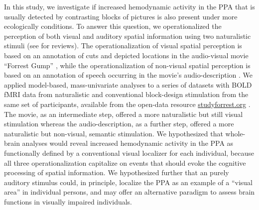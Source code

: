 \documentclass[english]{article}
\begin{document}
In this study, we investigate if increased hemodynamic activity in the PPA that
is usually detected by contrasting blocks of pictures is also present under more
ecologically conditions.
To answer this question, we operationalized the perception of both visual and
auditory spatial information using two naturalistic stimuli (see
\citep{hamilton2018revolution, hasson2008neurocinematics,
sonkusare2019naturalistic} for reviews).
The operationalization of visual spatial perception is based on an annotation of
cuts and depicted locations in the audio-visual movie ``Forrest Gump''
\citep{haeusler2016cutanno}, while
the operationalization of non-visual spatial perception is based on an
annotation of speech occurring in the movie's audio-description
\citep{hausler2021studyforrest}.
We applied model-based, mass-univariate analyses to a series of datasets with
BOLD fMRI data from naturalistic and conventional block-design stimulation from
the same set of participants, available from the open-data resource
\href{http://www.studyforrest.org}{studyforrest.org}
\citep{hanke2016simultaneous, hanke2014audiomovie, sengupta2016extension}.
The movie, as an intermediate step, offered a more naturalistic but still visual
stimulation whereas the audio-description, as a further step, offered a more
naturalistic but non-visual, semantic stimulation.
We hypothesized that whole-brain analyses would reveal increased hemodynamic
activity in the PPA as functionally defined by a conventional visual localizer
for each individual, because all three operationalization capitalize on events
that should evoke the cognitive processing of spatial information.
We hypothesized further that an purely auditory stimulus could, in principle,
localize the PPA as an example of a ``visual area'' in individual persons,
and may offer an alternative paradigm to assess brain functions in visually
impaired individuals.



\end{document}
